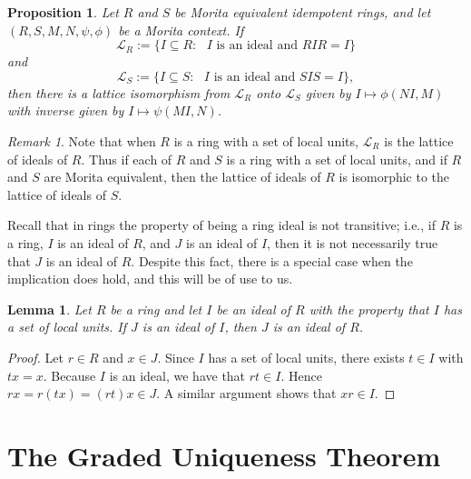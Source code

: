 \documentclass[11pt]{amsart}
\newtheorem{lemma}[theorem]{Lemma}
\newtheorem{proposition}[theorem]{Proposition}
\theoremstyle{remark}
\newtheorem{remark}[theorem]{Remark}
\numberwithin{equation}{section}
\begin{document}
\begin{proposition}  \cite[Proposition~3.5]{GS} \label{ideal-corresp-Mor-eq}
Let $R$ and $S$ be Morita equivalent idempotent rings, and let $(R,S,M,N,\psi, \phi)$ be a Morita context.  If $$\mathcal{L}_R := \{ I \subseteq R : \text{ $I$ is an ideal and $RIR=I$} \}$$ and $$\mathcal{L}_S := \{ I \subseteq S : \text{ $I$ is an ideal and $SIS=I$} \},$$ then there is a lattice isomorphism from $\mathcal{L}_R$ onto $\mathcal{L}_S$ given by $I \mapsto \phi (NI, M)$ with inverse given by $I \mapsto \psi (MI, N)$.
\end{proposition}

\begin{remark} \label{ideal-corresp-rings-loc-units}
Note that when $R$ is a ring with a set of local units, $\mathcal{L}_R$ is the lattice of ideals of $R$.  Thus if each of $R$ and $S$ is a ring with a set of local units, and if $R$ and $S$ are Morita equivalent, then the lattice of ideals of $R$ is isomorphic to the lattice of ideals of $S$.
\end{remark}


Recall that in rings the property of being a ring ideal is not transitive; i.e., if $R$ is a ring, $I$ is an ideal of $R$, and $J$ is an ideal of $I$, then it is not necessarily true that $J$ is an ideal of $R$.  Despite this fact, there is a special case when the implication does hold, and this will be of use to us.

\begin{lemma} \label{local-units-imply-trans}
Let $R$ be a ring and let $I$ be an ideal of $R$ with the property that $I$ has a set of local units.  If $J$ is an ideal of $I$, then $J$ is an ideal of $R$.
\end{lemma}

\begin{proof}
Let $r \in R$ and $x \in J$.  Since $I$ has a set of local units, there exists $t \in I$ with $tx = x$.  Because $I$ is an ideal, we have that $rt \in I$.  Hence $rx = r(tx) = (rt) x \in J$.  A similar argument shows that $xr \in I$.
\end{proof}



\section{The Graded Uniqueness Theorem} \label{GUT-sec}
\end{document}
